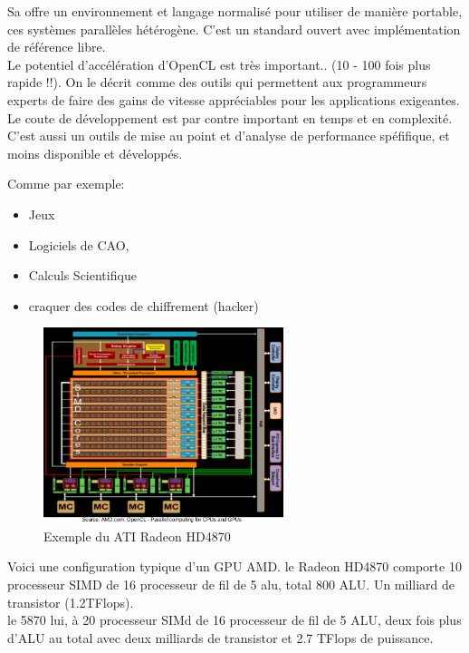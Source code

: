 \documentclass[oneside]{book}
\begin{document}
Sa offre un environnement et langage normalisé pour utiliser de manière portable, ces systèmes parallèles hétérogène. C'est un standard ouvert avec implémentation de référence libre.\\

Le potentiel d'accélération d'OpenCL est très important.. (10 - 100 fois plus rapide !!). On le décrit comme des outils qui permettent aux programmeurs experts de faire des gains de vitesse appréciables pour les applications exigeantes. Le coute de développement est par contre important en temps et en complexité. \\

C'est aussi un outils de mise au point et d'analyse de performance spéfifique, et moins disponible et développés. 

Comme par exemple:
\begin{itemize}
\item Jeux
\item Logiciels de CAO,
\item Calculs Scientifique
\item craquer des codes de chiffrement (hacker)
\end{itemize}

\begin{figure}[!ht]
\centering
\includegraphics[width = 7cm]{ati_radeon.png}
\caption{Exemple du ATI Radeon HD4870}
\label{fig:ati_radeon_exemple}

\end{figure}
Voici une configuration typique d'un GPU AMD. le Radeon HD4870 comporte 10 processeur SIMD de 16 processeur de fil de 5 alu, total 800 ALU. Un milliard de transistor (1.2TFlops).\\

le 5870 lui, à 20 processeur SIMd de 16 processeur de fil de 5 ALU, deux fois plus d'ALU au total avec deux milliards de transistor et 2.7 TFlops de puissance.\\
\end{document}
